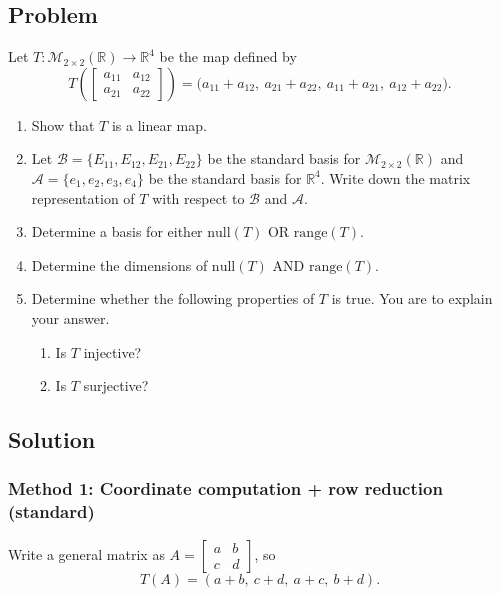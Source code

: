 \documentclass[12pt]{article}
\begin{document}
\subsection{Problem}
Let $T:\mathcal{M}_{2\times 2}(\mathbb{R})\to \mathbb{R}^4$ be the map defined by
\[
T\!\left(
\begin{bmatrix}
a_{11} & a_{12}\\
a_{21} & a_{22}
\end{bmatrix}
\right)
=
\bigl(a_{11}+a_{12},\ a_{21}+a_{22},\ a_{11}+a_{21},\ a_{12}+a_{22}\bigr).
\]
\begin{enumerate}[label=(\alph*)]
\item Show that $T$ is a linear map.
\item Let $\mathcal{B}=\{E_{11},E_{12},E_{21},E_{22}\}$ be the standard basis for $\mathcal{M}_{2\times 2}(\mathbb{R})$ and $\mathcal{A}=\{e_1,e_2,e_3,e_4\}$ be the standard basis for $\mathbb{R}^4$. Write down the matrix representation of $T$ with respect to $\mathcal{B}$ and $\mathcal{A}$.
\item Determine a basis for either $\mathrm{null}(T)$ OR $\mathrm{range}(T)$.
\item Determine the dimensions of $\mathrm{null}(T)$ AND $\mathrm{range}(T)$.
\item Determine whether the following properties of $T$ is true. You are to explain your answer.
  \begin{enumerate}[label=(\roman*)]
  \item Is $T$ injective?
  \item Is $T$ surjective?
  \end{enumerate}
\end{enumerate}
\vspace{3cm}
\subsection{Solution}
\subsubsection{Method 1: Coordinate computation + row reduction (standard)}
Write a general matrix as $A=\begin{bmatrix}a&b\\ c&d\end{bmatrix}$, so
\[
T(A)=(a+b,\ c+d,\ a+c,\ b+d).
\]
\end{document}
